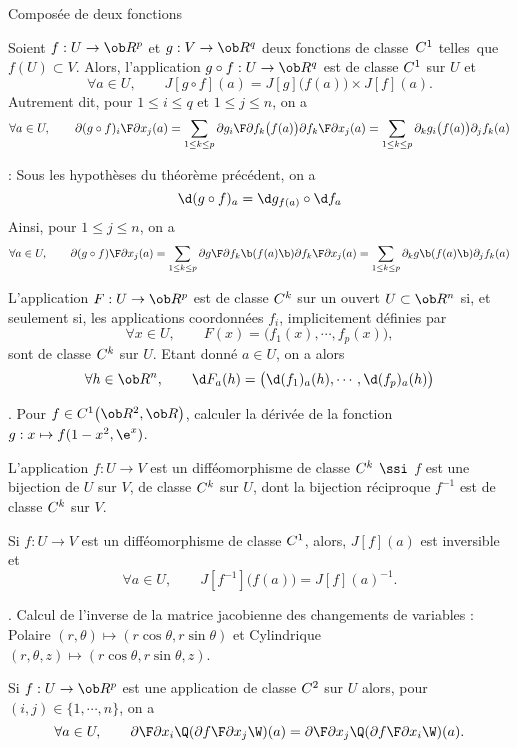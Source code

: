 \Concept Composée de deux fonctions
 

Soient $f:U\to\ob R^p$ et $g:V\to\ob R^q$ deux fonctions de classe~$\sc C^1$ telles~que~$f(U)\subset V$. Alors, l'application $g\circ f:U\to\ob R^q$ 
est de classe $\sc C^1$ sur $U$ et 
$$
\forall a\in U, \qquad J[g\circ f](a)=J[g]\big(f(a)\big)\times J[f](a). 
$$ 
Autrement dit, pour $1\le i\le q$ et $1\le j\le n$, on a 
$$
\forall a\in U, \qquad {\partial (g\circ f)_i\F\partial x_j}(a)=\sum_{1\le k\le p}{\partial g_i\F\partial f_k}\big(f(a)\big){\partial f_k\F\partial x_j}(a)
=\sum_{1\le k\le p}\partial_k g_i\big(f(a)\big)\partial_j f_k(a)
$$


\Remarque : Sous les hypothèses du théorème précédent, on a 
$$
\d(g\circ f)_a=\d g_{f(a)}\circ \d f_a
$$ 
Ainsi, pour $1\le j\le n$, on a 
$$
\forall a\in U,\qquad {\partial(g\circ f)\F\partial x_j}(a)
=\sum_{1\le k\le p}{\partial g\F\partial f_k}\b(f(a)\b){\partial f_k\F\partial x_j}(a)
=\sum_{1\le k\le p}\partial_k g\b(f(a)\b)\partial_j f_k(a)
$$


\Propriete [$U$ ouvert de $\ob R^n$] 
L'application $F:U\to\ob R^p$ est de classe $\sc C^k$ sur un ouvert $U\subset\ob R^n$ si, et seulement si, 
les applications coordonnées $f_i$, implicitement définies par 
$$
\forall x\in U, \qquad F(x)=\big(f_1(x),\cdots,f_p(x)\big),
$$
sont de classe $\sc C^k$ sur $U$. Etant donné $a\in U$, on a alors 
$$
\forall h\in \ob R^n, \qquad \d F_a(h)=\big(\d(f_1)_a(h),\cdots,\d(f_p)_a(h)\big)
$$


\Exemple. Pour $f\in\sc C^1\big(\ob R^2,\ob R\big)$, calculer la dérivée 
de la fonction $g:x\mapsto f(1-x^2,\e^x)$. 
\bigskip

L'application $f:U\to V$ est un difféomorphisme de classe $\sc C^k$ $\ssi$ $f$ est une bijection de $U$ sur $V$, 
de classe $\sc C^k$ sur $U$, 
dont la bijection réciproque $f^{-1}$ est de classe $\sc C^k$ sur $V$. 


\Propriete [$U$ et $V$ ouverts de $\ob R^n$]
Si $f:U\to V$ est un difféomorphisme de classe $\sc C^1$, alors, $J[f](a)$ est inversible et 
$$
\forall a\in U, \qquad J[f^{-1}]\big(f(a)\big)=J[f](a)^{-1}.
$$ 

\Exemple. Calcul de l'inverse de la matrice jacobienne des changements de variables : 
Polaire $(r,\theta)\mapsto(r\cos\theta,r\sin\theta)$ et Cylindrique $(r,\theta,z)\mapsto(r\cos\theta,r\sin\theta,z)$.  
\bigskip


\Theoreme [$U$ ouvert de $\ob R^n$] Si $f:U\to\ob R^p$ est une application de classe $\sc C^2$ sur $U$ 
alors, pour $(i,j)\in\{1,\cdots ,n\}$, on a 
$$
\forall a\in U,\qquad {\partial\F\partial x_i}\Q({\partial f\F\partial x_j}\W)(a)={\partial\F\partial x_j}\Q({\partial f\F\partial x_i}\W)(a). 
$$
\smallskip


